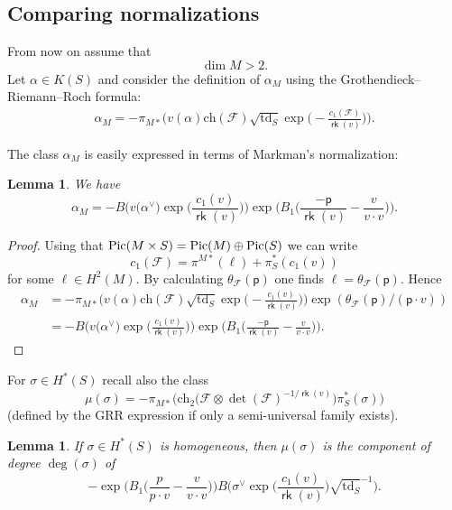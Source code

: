 \documentclass[pdftex]{sigma}
\numberwithin{equation}{section}
\newtheorem{Lemma}[Theorem]{Lemma}
\newcommand{\CF}{{\mathcal F}}
\newcommand{\pt}{{\mathsf{p}}}
\newcommand{\ch}{{\mathrm{ch}}}
\newcommand{\td}{{\mathrm{td}}}
\newcommand{\Pic}{\mathop{\rm Pic}\nolimits}
\newcommand{\1}{\mathsf{1}}
\newcommand\rk{\operatorname{\mathsf{rk}}}
\begin{document}
\subsection{Comparing normalizations} %
From now on assume that
\[ \dim M > 2. \]
Let $\alpha \in K(S)$ and consider the definition of $\alpha_M$
using the Grothendieck--Riemann--Roch formula:
\begin{gather*}
\alpha_M = - \pi_{M \ast}\bigg( v(\alpha) \ch(\CF) \sqrt{\td_S}
\exp\biggl( - \frac{c_1(\CF)}{\rk(v)} \biggr) \bigg).
\end{gather*}

The class $\alpha_M$ is easily expressed in terms of Markman's normalization:
\begin{Lemma} We have
\[
\alpha_M=
- B\bigg( v\big(\alpha^{\vee}\big) \exp\bigg( \frac{c_1(v)}{ \rk(v)} \bigg) \bigg)
\exp\bigg(  B_1\bigg( \frac{-\pt}{\rk(v)} - \frac{v}{v \cdot v} \bigg) \bigg).
\]
\end{Lemma}

\begin{proof}
Using that $\Pic(M \times S) = \Pic(M) \oplus \Pic(S)$ we can write
\[ c_1(\CF) = \pi^{M \ast}(\ell) + \pi_S^{\ast}(c_1(v)) \]
for some $\ell \in H^2(M)$. By calculating $\theta_{\CF}(\pt)$ one finds
$\ell = \theta_{\CF}(\pt)$.
Hence
\begin{align*}
\alpha_M
& = - \pi_{M \ast}\bigg(v(\alpha)\ch(\CF)\sqrt{\td_S}\exp\biggl(- \frac{c_1(v)}{ \rk(v)}\biggr)\bigg)
\exp( \theta_{\CF}(\pt) / (\pt \cdot v) )
\\
& = - B\bigg( v\big(\alpha^{\vee}\big) \exp\bigg( \frac{c_1(v)}{ \rk(v)} \bigg) \bigg)
\exp\bigg(  B_1\bigg( \frac{-\pt}{\rk(v)} - \frac{v}{v \cdot v} \bigg) \bigg) .\tag*{\qed}
\end{align*}
\renewcommand{\qed}{}
\end{proof}

For $\sigma \in H^{\ast}(S)$ recall also the class
\[
\mu(\sigma)=- \pi_{M \ast}\big(\ch_2\big(\CF \otimes \det(\CF)^{-1/\rk(v)}\big) \pi_S^{\ast}(\sigma)\big)
\]
(defined by the GRR expression if only a semi-universal family exists).

\begin{Lemma} If $\sigma \in H^{\ast}(S)$ is homogeneous, then $\mu(\sigma)$ is the component of degree $\deg(\sigma)$ of
\[
- \exp\bigg(B_1\bigg( \frac{p}{p \cdot v} - \frac{v}{v \cdot v} \bigg) \bigg)
B\bigg( \sigma^{\vee} \exp\bigg( \frac{c_1(v)}{\rk(v)} \bigg) \sqrt{\td_S}^{-1} \bigg).
\]
\end{Lemma}
\end{document}
